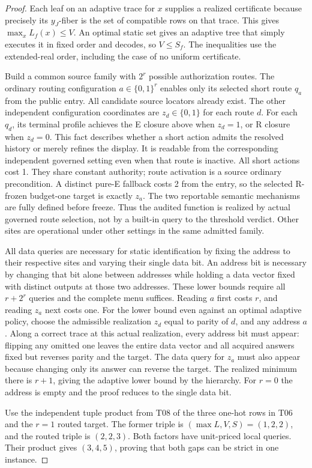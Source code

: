 \begin{proof}

Each leaf on an adaptive trace for \(x\) supplies a realized certificate because precisely its \(y_J\)-fiber is the set of compatible rows on that trace. This gives \(\max_xL_f(x)\le V\). An optimal static set gives an adaptive tree that simply executes it in fixed order and decodes, so \(V\le S_f\). The inequalities use the extended-real order, including the case of no uniform certificate.

Build a common source family with \(2^r\) possible authorization routes. The ordinary routing configuration \(a\in\{0,1\}^r\) enables only its selected short route \(q_a\) from the public entry. All candidate source locators already exist. The other independent configuration coordinates are \(z_d\in\{0,1\}\) for each route \(d\). For each \(q_d\), its terminal profile achieves the E closure above when \(z_d=1\), or R closure when \(z_d=0\). This fact describes whether a short action admits the resolved history or merely refines the display. It is readable from the corresponding independent governed setting even when that route is inactive. All short actions cost 1. They share constant authority; route activation is a source ordinary precondition. A distinct pure-E fallback costs 2 from the entry, so the selected R-frozen budget-one target is exactly \(z_a\). The two reportable semantic mechanisms are fully defined before freeze. Thus the audited function is realized by actual governed route selection, not by a built-in query to the threshold verdict. Other sites are operational under other settings in the same admitted family.

All data queries are necessary for static identification by fixing the address to their respective sites and varying their single data bit. An address bit is necessary by changing that bit alone between addresses while holding a data vector fixed with distinct outputs at those two addresses. These lower bounds require all \(r+2^r\) queries and the complete menu suffices. Reading \(a\) first costs \(r\), and reading \(z_a\) next costs one. For the lower bound even against an optimal adaptive policy, choose the admissible realization \(z_d\) equal to parity of \(d\), and any address \(a\). Along a correct trace at this actual realization, every address bit must appear: flipping any omitted one leaves the entire data vector and all acquired answers fixed but reverses parity and the target. The data query for \(z_a\) must also appear because changing only its answer can reverse the target. The realized minimum there is \(r+1\), giving the adaptive lower bound by the hierarchy. For \(r=0\) the address is empty and the proof reduces to the single data bit.

Use the independent tuple product from T08 of the three one-hot rows in T06 and the \(r=1\) routed target. The former triple is \((\max L,V,S)=(1,2,2)\), and the routed triple is \((2,2,3)\). Both factors have unit-priced local queries. Their product gives \((3,4,5)\), proving that both gaps can be strict in one instance.

\end{proof}

